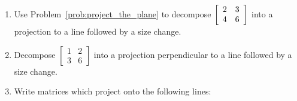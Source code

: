 \documentclass[../textbook.tex]{subfiles}
\begin{document}
\begin{enumerate}
\item Use Problem~\ref{prob:project_the_plane} to decompose $\left[\begin{array}{cc} 2 & 3 \\ 4 & 6 \end{array}\right]$ into a projection to a line followed by a size change.
\item Decompose $\left[\begin{array}{cc} 1 & 2 \\ 3 & 6\end{array}\right]$ into a projection perpendicular to a line followed by a size change.
\item Write matrices which project onto the following lines:
\begin{enumerate}
\end{enumerate}
\end{enumerate}
\end{document}
